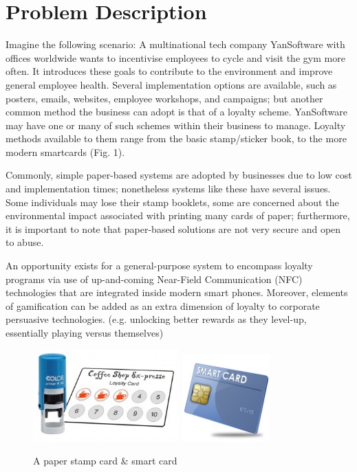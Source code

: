 \section{Problem Description}
Imagine the following scenario: A multinational tech company YanSoftware with offices worldwide wants to incentivise employees to cycle and visit the gym more often. It introduces these goals to contribute to the environment and improve general employee health. Several implementation options are available, such as posters, emails, websites, employee workshops, and campaigns; but another common method the business can adopt is that of a loyalty scheme. YanSoftware may have one or many of such schemes within their business to manage. Loyalty methods available to them range from the basic stamp/sticker book, to the more modern smartcards (Fig. 1).

Commonly, simple paper-based systems are adopted by businesses due to low cost and implementation times; nonetheless systems like these have several issues. Some individuals may lose their stamp booklets, some are concerned about the environmental impact associated with printing many cards of paper; furthermore, it is important to note that paper-based solutions are not very secure and open to abuse.

An opportunity exists for a general-purpose system to encompass loyalty programs via use of up-and-coming Near-Field Communication (NFC) technologies that are integrated inside modern smart phones. Moreover, elements of gamification can be added as an extra dimension of loyalty to corporate persuasive technologies. (e.g. unlocking better rewards as they level-up, essentially playing versus themselves)

\begin{figure}[h!]
    \centering
    \includegraphics[width=0.5\textwidth]{img/Loyalty-card.jpg}
    \qquad
    \includegraphics[width=0.3\textwidth]{img/smartcard.png}
    \caption{A paper stamp card \& smart card}%
\end{figure}
\clearpage{}

